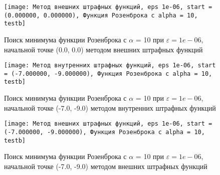             \begin{figure}[H]
	        \centering
	        \texttt{[image: Метод внешних штрафных функций, eps 1e-06, start = (0.000000, 0.000000), Функция Розенброка с alpha = 10, testb]}%
	        \caption{Поиск минимума функции Розенброка с $\alpha$ = 10 при $\varepsilon = 1e-06$, начальной точке (0.0, 0.0) методом внешних штрафных функций}
	        \vspace*{-1.2cm}
            \end{figure}
            
            \begin{figure}[H]
	        \centering
	        \texttt{[image: Метод внутренних штрафных функций, eps 1e-06, start = (-7.000000, -9.000000), Функция Розенброка с alpha = 10, testb]}%
	        \caption{Поиск минимума функции Розенброка с $\alpha$ = 10 при $\varepsilon = 1e-06$, начальной точке (-7.0, -9.0) методом внутренних штрафных функций}
	        \vspace*{-1.2cm}
            \end{figure}
            
            \begin{figure}[H]
	        \centering
	        \texttt{[image: Метод внешних штрафных функций, eps 1e-06, start = (-7.000000, -9.000000), Функция Розенброка с alpha = 10, testb]}%
	        \caption{Поиск минимума функции Розенброка с $\alpha$ = 10 при $\varepsilon = 1e-06$, начальной точке (-7.0, -9.0) методом внешних штрафных функций}
	        \vspace*{-1.2cm}
            \end{figure}
            